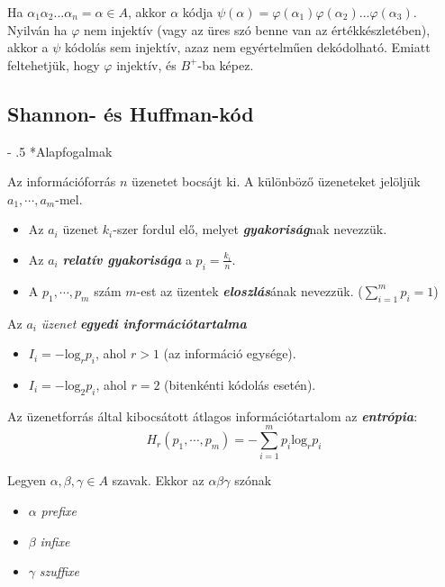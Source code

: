 \documentclass[12pt,margin=0px]{article}
\makeatletter
\newcommand\ddfrac[2]{\frac{\displaystyle #1}{\displaystyle #2}}
\renewcommand\paragraph{%
	\@startsection{paragraph}{4}{0mm}%
	{-\baselineskip}%
	{.5\baselineskip}%
	{\normalfont\normalsize\bfseries}}
\makeatother
\begin{document}
    \noindent Ha $\alpha_1\alpha_2...\alpha_n = \alpha \in A$, akkor $\alpha$ kódja $\psi(\alpha) = \varphi(\alpha_1)\varphi(\alpha_2)...\varphi(\alpha_3)$. Nyilván ha $\varphi$ nem injektív (vagy az üres szó benne van az értékkészletében), akkor a $\psi$ kódolás sem injektív, azaz nem egyértelműen dekódolható. Emiatt feltehetjük, hogy $\varphi$ injektív, és $B^+$-ba képez.
			
    \subsection*{Shannon- és Huffman-kód}
			
    \paragraph*{Alapfogalmak}

    \noindent Az információforrás $n$ üzenetet bocsájt ki. A különböző üzeneteket jelöljük $a_1, \cdots, a_m$-mel.
    \begin{itemize}[leftmargin=5.5mm]
        \renewcommand{\labelitemi}{$\vcenter{\hbox{\tiny$\bullet$}}$}
        \item Az $a_i$ üzenet $k_i$-szer fordul elő, melyet \emph{\textbf{gyakoriság}}nak nevezzük.
        \item Az $a_i$ \emph{\textbf{relatív gyakorisága}} a $p_i = \ddfrac{k_i}{n}$.
        \item A $p_1,\cdots,p_m$ szám $m$-est az üzentek \emph{\textbf{eloszlás}}ának nevezzük. ($\sum\limits_{i=1}^{m}p_i = 1$)
    \end{itemize}

    \noindent Az $a_i$ \emph{üzenet} \emph{\textbf{egyedi információtartalma}}
    \begin{itemize}[leftmargin=5.5mm]
        \renewcommand{\labelitemi}{$\vcenter{\hbox{\tiny$\bullet$}}$}
        \item $I_i = - \text{log}_rp_i$, ahol $r>1$ (az információ egysége).
        \item $I_i = - \text{log}_2p_i$, ahol $r = 2$ (bitenkénti kódolás esetén).
    \end{itemize}

    \noindent Az üzenetforrás által kibocsátott átlagos információtartalom az \emph{\textbf{entrópia}}:
    \[
        H_r(p_1, \cdots, p_m) = - \sum\limits_{i=1}^{m}p_i\text{log}_rp_i
    \]

    \noindent Legyen $\alpha, \beta, \gamma \in A$ szavak. Ekkor az $\alpha\beta\gamma$ szónak
    \begin{itemize}[leftmargin=5.5mm]
        \renewcommand{\labelitemi}{$\vcenter{\hbox{\tiny$\bullet$}}$}
        \item $\alpha$ \emph{prefixe}
        \item $\beta$ \emph{infixe}
        \item $\gamma$ \emph{szuffixe}\\
    \end{itemize}
\end{document}

